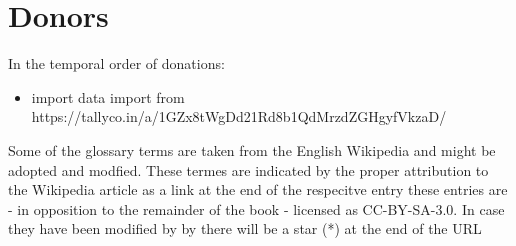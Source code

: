 \documentclass[a4paper,12pt,oneside,openany]{book}
\begin{document}
\section{Donors}
In the temporal order of donations:
\begin{itemize}
\item import data import from https://tallyco.in/a/1GZx8tWgDd21Rd8b1QdMrzdZGHgyfVkzaD/


\end{itemize}

\glsaddall

Some of the glossary terms are taken from the English Wikipedia and might be adopted and modfied. These termes are indicated by the proper attribution to the Wikipedia article as a link at the end of the respecitve entry these entries are - in opposition to the remainder of the book - licensed as CC-BY-SA-3.0. In case they have been modified by by there will be a star (*) at the end of the URL

\printnoidxglossaries
\end{document}
